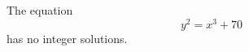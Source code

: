 \begin{proposition}
    The equation
\[
    y^2=x^3+70
\]
    has no integer solutions.
\end{proposition}
